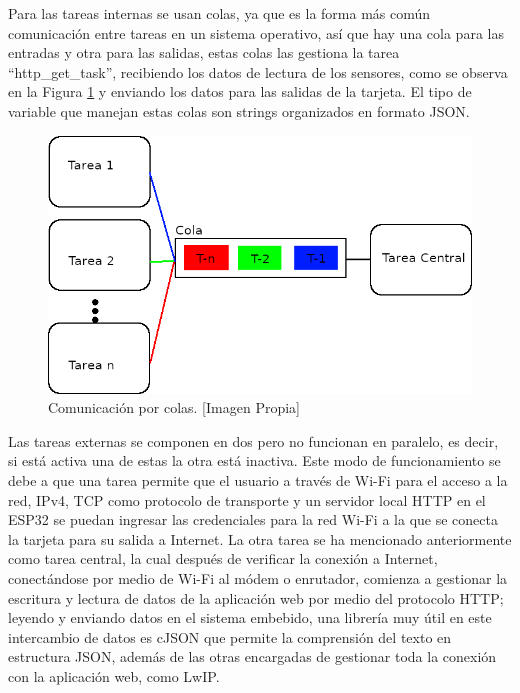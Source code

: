 Para las tareas internas se usan colas, ya que es la forma más común comunicación entre tareas en un sistema operativo, así que hay una cola para las entradas y otra para las salidas, estas colas las gestiona la tarea ``http\_get\_task'', recibiendo los datos de lectura de los sensores, como se observa en la Figura \ref{fig:colas} y enviando los datos para las salidas de la tarjeta. El tipo de variable que manejan estas colas son strings organizados en formato JSON.\\

\begin{figure}[H]
	\centering
	\caption[Comunicación por colas.]{Comunicación por colas. [Imagen Propia]}
	\label{fig:colas}
	\includegraphics[width=0.5\linewidth]{Imagenes/B_colas}
\end{figure}

Las tareas externas se componen en dos pero no funcionan en paralelo, es decir, si está activa una de estas la otra está inactiva. Este modo de funcionamiento se debe a que una tarea permite que el usuario a través de Wi-Fi para el acceso a la red, IPv4, TCP como protocolo de transporte y un servidor local HTTP en el ESP32 se puedan ingresar las credenciales para la red Wi-Fi a la que se conecta la tarjeta para su salida a Internet. La otra tarea se ha mencionado anteriormente como tarea central, la cual después de verificar la conexión a Internet, conectándose por medio de Wi-Fi al módem o enrutador, comienza a gestionar la escritura y lectura de datos de la aplicación web por medio del protocolo HTTP; leyendo y enviando datos en el sistema embebido, una librería muy útil en este intercambio de datos es cJSON que permite la comprensión del texto en estructura JSON, además de las otras encargadas de gestionar toda la conexión con la aplicación web, como LwIP.\\


